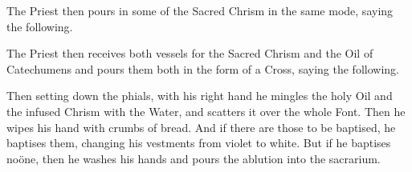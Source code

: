 \begin{adjustwidth}{0in}{-1em}
\begin{rubric}
    The Priest then pours in some of the Sacred Chrism in the same mode, saying the following.
\end{rubric}
\end{adjustwidth}


\begin{rubric}
    The Priest then receives both vessels for the Sacred Chrism and the Oil of Catechumens and pours them both in the form of a Cross, saying the following.
\end{rubric}

\begin{rubric}
Then setting down the phials, with his right hand he mingles the holy Oil and the infused Chrism with the Water, and scatters it over the whole Font. Then he wipes his hand with crumbs of bread. And if there are those to be baptised, he baptises them, changing his vestments from violet to white. But if he baptises no{\"o}ne, then he washes his hands and pours the ablution into the sacrarium.
\end{rubric}